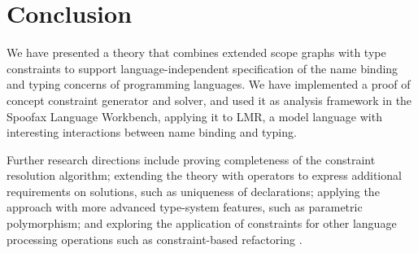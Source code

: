 \section{Conclusion}

We have presented a theory that combines extended scope graphs with type
constraints to support language-independent specification of the name binding
and typing concerns of programming languages. We have implemented a proof of
concept constraint generator and solver, and used it as analysis framework in
the Spoofax Language Workbench, applying it to LMR, a model language with
interesting interactions between name binding and typing.

Further research directions include proving completeness of the constraint
resolution algorithm; extending the theory with operators to express additional
requirements on solutions, such as uniqueness of declarations; applying the
approach with more advanced type-system features, such as parametric
polymorphism; and exploring the application of constraints for other language
processing operations such as constraint-based refactoring \cite{SteimannP12}.

